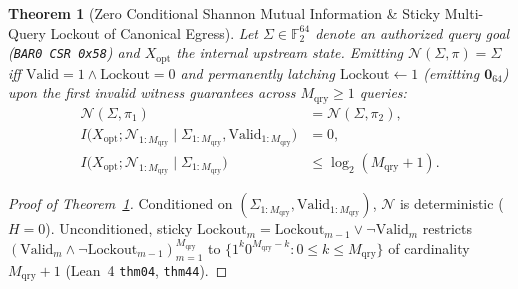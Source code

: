 \documentclass[11pt,letterpaper]{article}
\theoremstyle{spectralthm}
\newtheorem{theorem}{Theorem}[section]
\begin{document}
\begin{theorem}[Zero Conditional Shannon Mutual Information \& Sticky Multi-Query Lockout of Canonical Egress]
\label{thm:egress}
Let $\Sigma \in \mathbb{F}_2^{64}$ denote an authorized query goal (\texttt{BAR0 CSR 0x58}) and $X_{\mathrm{opt}}$ the internal upstream state. Emitting $\mathcal{N}(\Sigma, \pi) = \Sigma$ iff $\mathrm{Valid} = 1 \wedge \mathrm{Lockout} = 0$ and permanently latching $\mathrm{Lockout} \leftarrow 1$ (emitting $\mathbf{0}_{64}$) upon the first invalid witness guarantees across $M_{\mathrm{qry}} \ge 1$ queries:
\begin{equation}
\label{eq:egress_mi}
\begin{aligned}
\mathcal{N}(\Sigma, \pi_1) &= \mathcal{N}(\Sigma, \pi_2),\\
I\bigl(X_{\mathrm{opt}}; \mathcal{N}_{1:M_{\mathrm{qry}}} \;\big|\; \Sigma_{1:M_{\mathrm{qry}}}, \mathrm{Valid}_{1:M_{\mathrm{qry}}}\bigr) &= 0,\\
I\bigl(X_{\mathrm{opt}}; \mathcal{N}_{1:M_{\mathrm{qry}}} \;\big|\; \Sigma_{1:M_{\mathrm{qry}}}\bigr) &\le \log_2(M_{\mathrm{qry}} + 1).
\end{aligned}
\end{equation}
\end{theorem}
\begin{proof}[Proof of Theorem~\ref{thm:egress}]
Conditioned on $(\Sigma_{1:M_{\mathrm{qry}}}, \mathrm{Valid}_{1:M_{\mathrm{qry}}})$, $\mathcal{N}$ is deterministic ($H = 0$). Unconditioned, sticky $\mathrm{Lockout}_m = \mathrm{Lockout}_{m-1} \vee \neg\mathrm{Valid}_m$ restricts $(\mathrm{Valid}_m \wedge \neg\mathrm{Lockout}_{m-1})_{m=1}^{M_{\mathrm{qry}}}$ to $\{1^k 0^{M_{\mathrm{qry}}-k} : 0 \le k \le M_{\mathrm{qry}}\}$ of cardinality $M_{\mathrm{qry}}+1$ (Lean~4 \texttt{thm04}, \texttt{thm44}).
\end{proof}
\end{document}
